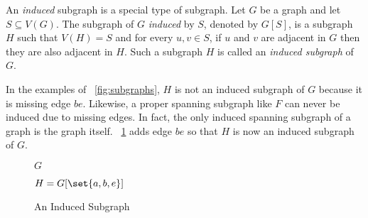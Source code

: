 An \emph{induced} subgraph is a special type of subgraph.  Let \(G\) be a graph and let \(S\subseteq V(G)\).  The
subgraph of \(G\) \emph{induced} by \(S\), denoted by \(G[S]\), is a subgraph \(H\) such that \(V(H)=S\) and for
every \(u,v\in S\), if \(u\) and \(v\) are adjacent in \(G\) then they are also adjacent in \(H\).  Such a subgraph
\(H\) is called an \emph{induced subgraph} of \(G\).

In the examples of \figurename~\ref{fig:subgraphs}, \(H\) is not an induced subgraph of \(G\) because it is missing
edge \(be\).  Likewise, a proper spanning subgraph like \(F\) can never be induced due to missing edges.  In fact,
the only induced spanning subgraph of a graph is the graph itself.  \figurename~\ref{fig:induced} adds edge \(be\)
so that \(H\) is now an induced subgraph of \(G\).

\begin{figure}[H]
  \label{fig:induced}
  \begin{minipage}{3in}
    \begin{center}

      \bigskip

      \(G\)
    \end{center}
  \end{minipage}
  \begin{minipage}{3in}
    \begin{center}

      \bigskip

      \(H=G[\set{a,b,e}]\)
    \end{center}
  \end{minipage}
  \caption{An Induced Subgraph}
\end{figure}


